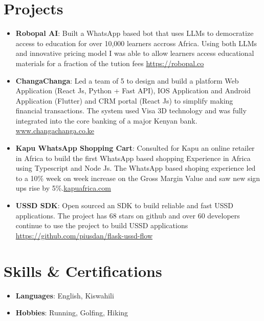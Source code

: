 \documentclass[letterpaper,11pt]{article}
\newcommand{\resumeItem}[2]{
  \item\small{
    \textbf{#1}{: #2 \vspace{-2pt}}
  }
}
\newcommand{\resumeSubItem}[2]{\resumeItem{#1}{#2}\vspace{-4pt}}
\newcommand{\resumeSubHeadingListStart}{\begin{itemize}[leftmargin=*]}
\newcommand{\resumeSubHeadingListEnd}{\end{itemize}}
\newcommand{\resumeItemListStart}{\begin{itemize}}
\newcommand{\resumeItemListEnd}{\end{itemize}\vspace{-5pt}}
\begin{document}
\section{Projects}
  \resumeSubHeadingListStart  	
	  \resumeSubItem {Robopal AI}
	  {Built a WhatsApp based bot that uses LLMs to democratize access to education for over 10,000 learners accross Africa. Using both LLMs and innovative pricing model I was able to allow learners access educational materials for a fraction of the tution fees \href{https://robopal.co}{https://robopal.co}}
	\resumeSubItem {ChangaChanga}
	{Led a team of 5 to design and build a platform Web Application (React Js, Python + Fast API), IOS Application and Android Application (Flutter) and CRM portal (React Js) to simplify making financial transactions. The system used Visa 3D technology and was fully integrated into the core banking of a major Kenyan bank. \href{https://changachanga.co.ke}{www.changachanga.co.ke}}
\resumeSubItem{Kapu WhatsApp Shopping Cart}
{Consulted for Kapu an online retailer in Africa to build the first WhatsApp based shopping Experience in Africa using Typescript and Node Js. The WhatsApp based shoping experience led to a 10\% week on week increase on the Gross Margin Value and saw new sign ups rise by 5\%.\href{https://kapuafrica.com}{kapuafrica.com}}
    \resumeSubItem{USSD SDK}
      {Open sourced an SDK to build reliable and fast USSD applications. The project has 68 stars on github and over 60 developers continue to use the project to build USSD applications \href{https://github.com/piusdan/flask-ussd-flow}{https://github.com/piusdan/flask-ussd-flow}}
  \resumeSubHeadingListEnd

\section{Skills \& Certifications}
      \resumeItemListStart
        \resumeItem{Languages} {English, Kiswahili}
        \resumeItem{Hobbies} {Running, Golfing, Hiking}
      \resumeItemListEnd
\end{document}
